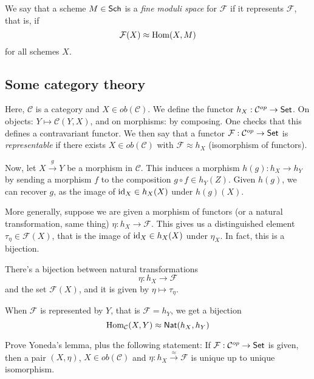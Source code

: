 \documentclass[11pt, english]{article}
\begin{document}
We say that a scheme $M \in \mathsf{Sch}$ is a \emph{fine moduli space} for $\mathcal F$ if it represents $\mathcal F$, that is, if
\[
\mathcal F (X) \approx \operatorname{Hom}(X,M)
\]
for all schemes $X$.

\subsection{Some category theory}

Here, $\mathcal C$ is a category and $X \in ob(\mathcal C)$. We define the functor $h_X: \mathcal C^{op} \to \mathsf{Set}$. On objects: $Y \mapsto \mathcal C (Y,X)$, and on morphisms: by composing. One checks that this defines a contravariant functor. We then say that a functor $\mathcal F:\mathcal C^{op} \to \mathsf{Set}$ is \emph{representable} if there exists $X \in ob(\mathcal C)$ with $\mathcal F \approx h_X$ (isomorphism of functors).

Now, let $X \xrightarrow{g} Y$ be a morphism in $\mathcal C$. This induces a morphism $h(g):h_X \to h_Y$ by sending a morphism $f$ to the composition $g \circ f \in h_Y(Z)$. Given $h(g)$, we can recover $g$, as the image of $\text{id}_X \in h_X(X)$ under $h(g)(X)$.

More generally, suppose we are given a morphism of functors (or a natural transformation, same thing) $\eta:h_X \to \mathcal F$. This gives us a distinguished element $\tau_\eta \in \mathcal F (X)$, that is the image of $\text{id}_X \in h_X(X)$ under $\eta_X$. In fact, this is a bijection.

\begin{lemma}
There's a bijection between natural transformations
\[
\eta: h_X \to \mathcal F
\]
and the set $\mathcal{F}(X)$, and it is given by $\eta \mapsto \tau_\eta$.
\end{lemma}

\begin{example}
When $\mathcal F$ is represented by $Y$, that is $\mathcal F = h_Y$, we get a bijection
\[
\operatorname{Hom}_{\mathcal{C}} (X,Y) \approx \mathsf{Nat}(h_X,h_Y) 
\]
\end{example}

\begin{exc}
Prove Yoneda's lemma, plus the following statement: If $\mathcal F : \mathcal C^{op} \to \mathsf{Set}$ is given, then a pair $(X,\eta)$, $X \in ob(\mathcal C)$ and $\eta:h_X \xrightarrow{\approx} \mathcal F$ is unique up to unique isomorphism.
\end{exc}
\begin{sol}

\end{sol}
\end{document}

